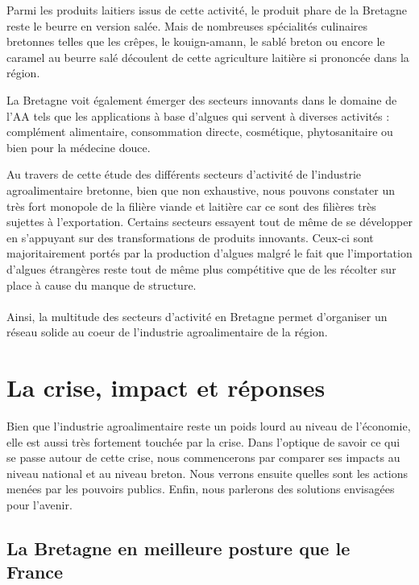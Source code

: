 \documentclass[a4paper,12pt]{report}
\begin{document}
			Parmi les produits laitiers issus de cette activité, le produit phare de la Bretagne reste le beurre en version salée. Mais de nombreuses spécialités culinaires bretonnes telles que les crêpes, le kouign-amann, le sablé breton ou encore le caramel au beurre salé découlent de cette agriculture laitière si prononcée dans la région.
			
			La Bretagne voit également émerger des secteurs innovants dans le domaine de l’AA tels que les applications à base d’algues qui servent à diverses activités\cite{CartesBretagneAgroAlimentaire20142016} : complément alimentaire, consommation directe, cosmétique, phytosanitaire ou bien pour la médecine douce.
			
			Au travers de cette étude des différents secteurs d’activité de l’industrie agroalimentaire bretonne, bien que non exhaustive, nous pouvons constater un très fort monopole de la filière viande et laitière car ce sont des filières très sujettes à l’exportation. Certains secteurs essayent tout de même de se développer en s’appuyant sur des transformations de produits innovants. Ceux-ci sont majoritairement portés par la production d’algues malgré le fait que l’importation d’algues étrangères reste tout de même plus compétitive que de les récolter sur place à cause du manque de structure.
			
			\paragraph{}Ainsi, la multitude des secteurs d'activité en Bretagne permet d'organiser un réseau solide au coeur de l'industrie agroalimentaire de la région.
			
			
	\section{La crise, impact et réponses}
		Bien que l'industrie agroalimentaire reste un poids lourd au niveau de l'économie, elle est aussi très fortement touchée par la crise. Dans l’optique de savoir ce qui se passe autour de cette crise, nous commencerons par comparer ses impacts au niveau national et au niveau breton. Nous verrons ensuite quelles sont les actions menées par les pouvoirs publics. Enfin, nous parlerons des solutions envisagées pour l’avenir.
		
		\subsection{La Bretagne en meilleure posture que le France}
\end{document}
